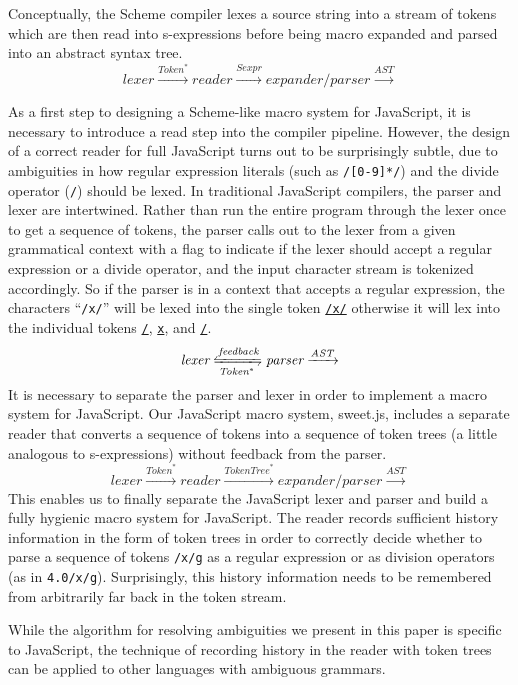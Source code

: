 \documentclass[preprint,10pt]{sigplanconf}
\begin{document}
Conceptually, the Scheme compiler lexes a source string into
a stream of tokens which are then read into s-expressions
before being macro expanded and parsed into an abstract syntax tree.
\[
\textit{lexer} \xrightarrow{\textit{Token}^{*}}
\textit{reader} \xrightarrow{\textit{Sexpr}}
\textit{expander/parser} \xrightarrow{\textit{AST}}
\]

As a first step to designing a Scheme-like macro system for
JavaScript, it is necessary to introduce a read step into the compiler
pipeline. However, the design of a correct reader for full JavaScript
turns out to be surprisingly subtle, due to ambiguities in how regular
expression literals (such as \verb!/[0-9]*/!) and the divide
operator (\verb!/!) should be lexed. In traditional JavaScript
compilers, the parser and lexer are intertwined. Rather than run the
entire program through the lexer once to get a sequence of tokens, the
parser calls out to the lexer from a given grammatical context with a
flag to indicate if the lexer should accept a regular expression or
a divide operator, and the input character stream is tokenized accordingly.
So if the parser is in a context that accepts a regular expression, the characters ``\verb!/x/!'' will be lexed into the single token \underline{\verb!/x/!} otherwise it will lex into the individual tokens \underline{\verb!/!}, \underline{\verb!x!}, and \underline{\verb!/!}.
\[
\textit{lexer} \xleftrightharpoons[\textit{Token}^{*}]{\textit{feedback}}
\textit{parser} \xrightarrow{\textit{AST}}
\]
It is necessary to separate the parser and lexer in order to implement
a macro system for JavaScript. Our JavaScript macro system,
sweet.js, includes a separate
reader that converts a sequence of tokens into a sequence of token
trees (a little analogous to s-expressions) without feedback from the
parser.
\[
\textit{lexer} \xrightarrow{\textit{Token}^{*}}
\textit{reader} \xrightarrow{\textit{TokenTree}^{*}}
\textit{expander/parser} \xrightarrow{\textit{AST}}
\]
This enables us to finally separate the JavaScript lexer and parser
and build a fully hygienic macro system for JavaScript. The reader
records sufficient history information in the form of token trees in
order to correctly decide whether to parse a sequence of tokens
\verb!/x/g! as a regular expression or as division operators (as in
\verb!4.0/x/g!). Surprisingly, this history information needs to be
remembered from arbitrarily far back in the token stream.

While the algorithm for resolving ambiguities we present in this paper
is specific to JavaScript, the technique of recording history in the
reader with token trees can be applied to other languages with
ambiguous grammars.
\end{document}
